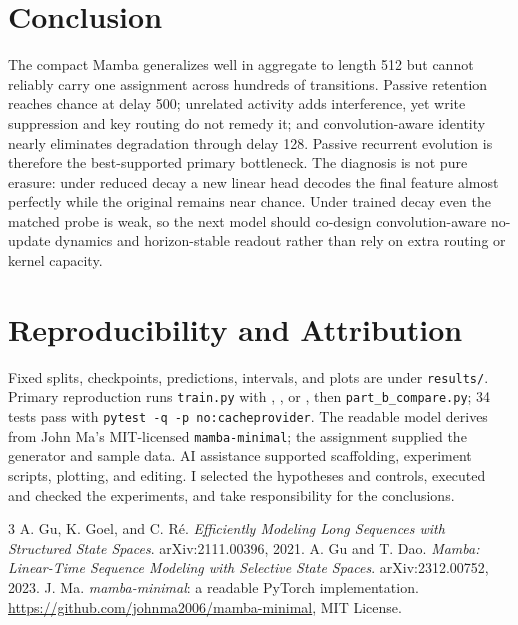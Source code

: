 \documentclass[10pt,a4paper]{article}
\begin{document}
\section{Conclusion}
The compact Mamba generalizes well in aggregate to length 512 but cannot reliably carry one assignment across hundreds of transitions. Passive retention reaches chance at delay 500; unrelated activity adds interference, yet write suppression and key routing do not remedy it; and convolution-aware identity nearly eliminates degradation through delay 128. Passive recurrent evolution is therefore the best-supported primary bottleneck. The diagnosis is not pure erasure: under reduced decay a new linear head decodes the final feature almost perfectly while the original remains near chance. Under trained decay even the matched probe is weak, so the next model should co-design convolution-aware no-update dynamics and horizon-stable readout rather than rely on extra routing or kernel capacity.

\section{Reproducibility and Attribution}
Fixed splits, checkpoints, predictions, intervals, and plots are under \texttt{results/}. Primary reproduction runs \texttt{train.py} with , , or , then \texttt{part\_b\_compare.py}; 34 tests pass with \texttt{pytest -q -p no:cacheprovider}. The readable model derives from John Ma's MIT-licensed \texttt{mamba-minimal}; the assignment supplied the generator and sample data. AI assistance supported scaffolding, experiment scripts, plotting, and editing. I selected the hypotheses and controls, executed and checked the experiments, and take responsibility for the conclusions.

\begin{thebibliography}{3}\small
{} A. Gu, K. Goel, and C. R\'e. \emph{Efficiently Modeling Long Sequences with Structured State Spaces}. arXiv:2111.00396, 2021.
 A. Gu and T. Dao. \emph{Mamba: Linear-Time Sequence Modeling with Selective State Spaces}. arXiv:2312.00752, 2023.
 J. Ma. \emph{mamba-minimal}: a readable PyTorch implementation. \url{https://github.com/johnma2006/mamba-minimal}, MIT License.
\end{thebibliography}
\end{document}
